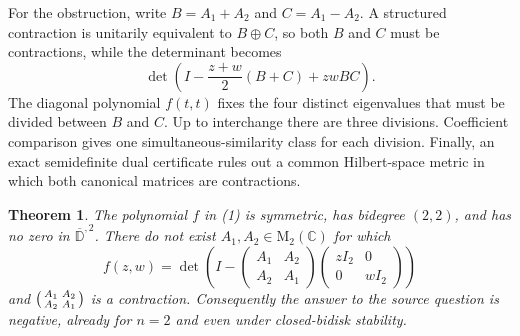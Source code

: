 \documentclass[11pt]{article}
\newtheorem{theorem}{Theorem}
\newcommand{\D}{\mathbb D}
\newcommand{\M}{\mathrm M}
\begin{document}
For the obstruction, write $B=A_1+A_2$ and $C=A_1-A_2$.  A structured contraction is unitarily equivalent to $B\oplus C$, so both $B$ and $C$ must be contractions, while the determinant becomes
\[
 \det\!\left(I-\frac{z+w}{2}(B+C)+zwBC\right).
\]
The diagonal polynomial $f(t,t)$ fixes the four distinct eigenvalues that must be divided between $B$ and $C$.  Up to interchange there are three divisions.  Coefficient comparison gives one simultaneous-similarity class for each division.  Finally, an exact semidefinite dual certificate rules out a common Hilbert-space metric in which both canonical matrices are contractions.

\begin{theorem}
The polynomial $f$ in \emph{(1)} is symmetric, has bidegree $(2,2)$, and has no zero in $\overline{\D}^{,2}$.  There do not exist $A_1,A_2\in\M_2(\mathbb C)$ for which
\[
 f(z,w)=\det\!\left(I-
 \begin{pmatrix}A_1&A_2\\A_2&A_1\end{pmatrix}
 \begin{pmatrix}zI_2&0\\0&wI_2\end{pmatrix}\right)
\]
and $\begin{psmallmatrix}A_1&A_2\\A_2&A_1\end{psmallmatrix}$ is a contraction.  Consequently the answer to the source question is negative, already for $n=2$ and even under closed-bidisk stability.
\end{theorem}
\end{document}
